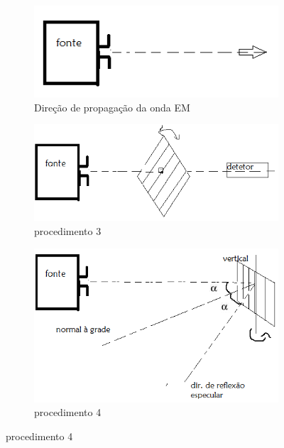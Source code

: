 \documentclass[a4paper,11pt]{article}
\begin{document}
\begin{figure}[!htp]
			\centering
			\begin{subfigure}[b]{0.3\textwidth}
						
					\includegraphics[scale=0.6]{fonte-eixo.png}
					\caption{Direção de propagação da onda EM }
					\label{fonte-eixo}
			\end{subfigure}
			\qquad
			\begin{subfigure}[b]{0.3\textwidth}
					\centering					
					\includegraphics[scale=0.6]{grade-polarizadora.png}
					\caption{procedimento 3 }
					\label{grade-polarizadora}
			\end{subfigure}
			
			\begin{subfigure}[b]{0.3\textwidth}
					\centering					
					\includegraphics[scale=0.6]{grade-reflexao.png}
					\caption{procedimento 4}
					\label{grade-reflexão}
			\end{subfigure}


\end{figure}
\end{document}
